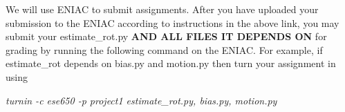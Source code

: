 \documentclass{article}
\begin{document}
We will use ENIAC to submit assignments. 
After you have uploaded your submission to the ENIAC according to instructions in the above link, you may submit your estimate\_rot.py \textbf{AND ALL FILES IT DEPENDS ON} for grading by running the following command on the ENIAC. For example, if estimate\_rot depends on bias.py and motion.py then turn your assignment in using

\textit{turnin -c ese650 -p project1 estimate\_rot.py, bias.py, motion.py}
\end{document}

